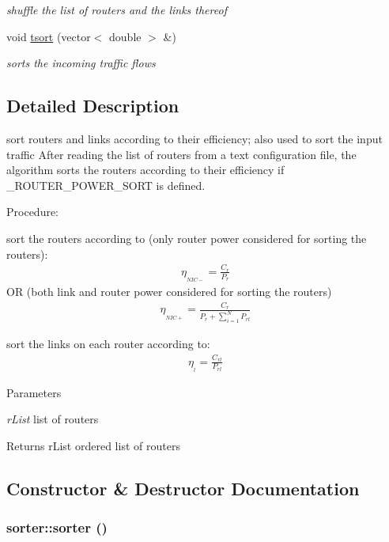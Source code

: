 \begin{DoxyCompactItemize}
\begin{DoxyCompactList}\small\item\em shuffle the list of routers and the links thereof \item\end{DoxyCompactList}\item 
void \hyperlink{classsorter_ae5717a09e1732631a6edcf122f2498c5}{tsort} (vector$<$ double $>$ \&)
\begin{DoxyCompactList}\small\item\em sorts the incoming traffic flows \item\end{DoxyCompactList}\end{DoxyCompactItemize}


\subsection{Detailed Description}
sort routers and links according to their efficiency; also used to sort the input traffic After reading the list of routers from a text configuration file, the algorithm sorts the routers according to their efficiency if \_\-ROUTER\_\-POWER\_\-SORT is defined.

Procedure: \begin{DoxyItemize}
\item sort the routers according to (only router power considered for sorting the routers): \begin{eqnarray} \eta_{_{NIC-}} = \frac{C_{r}}{P_{r}} \end{eqnarray} OR (both link and router power considered for sorting the routers) \begin{eqnarray} \eta_{_{NIC+}} = \frac{C_{r}}{P_{r} + \sum_{i=1}^N{P_{rl}}} \end{eqnarray} \item sort the links on each router according to: \begin{eqnarray} \eta_{_l} = \frac{C_{rl}}{P_{rl}} \end{eqnarray} 
\begin{DoxyParams}{Parameters}
\item[{\em rList}]list of routers \end{DoxyParams}
\begin{DoxyReturn}{Returns}
rList ordered list of routers 
\end{DoxyReturn}
\end{DoxyItemize}


\subsection{Constructor \& Destructor Documentation}
\hypertarget{classsorter_a0ff82eecc48ab163c3286cee244b7d92}{
\subsubsection[{sorter}]{\setlength{\rightskip}{0pt plus 5cm}sorter::sorter ()}}
\label{classsorter_a0ff82eecc48ab163c3286cee244b7d92}


